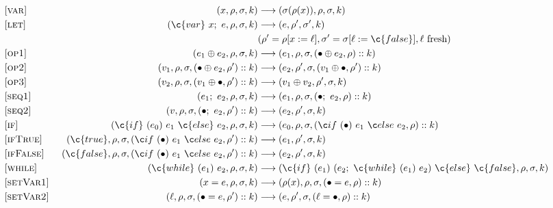 \begin{figure*}
  \begin{center}
\begin{align*}
  \omit [\textsc{var}] &&
    (x, \rho, \sigma, k)
    & \longrightarrow
    (\sigma(\rho(x)), \rho, \sigma, k)
\\
  \omit [\textsc{let}] &&
    (\c{var}~x;~e, \rho, \sigma, k)
    & \longrightarrow
    (e, \rho', \sigma', k) 
        \\ &&& (\rho' = \rho[x := \ell], \sigma' = \sigma[\ell := \c{false}], \ell~\mbox{fresh})
\\
  \omit [\textsc{op1}] &&
    (e_1 \oplus  e_2, \rho, \sigma, k)
    & \longrightarrow
    (e_1, \rho, \sigma, (\bullet \oplus e_2,\rho)::k)
\\
  \omit [\textsc{op2}] &&
    (v_1, \rho, \sigma, (\bullet \oplus e_2,\rho')::k)
    & \longrightarrow
    (e_2, \rho', \sigma, (v_1\oplus \bullet,\rho')::k)
\\
  \omit [\textsc{op3}] &&
    (v_2, \rho, \sigma, (v_1 \oplus \bullet,\rho')::k)
    & \longrightarrow
    (v_1 \oplus v_2, \rho', \sigma, k)
\\
  \omit [\textsc{seq1}] &&
    (e_1;~e_2, \rho, \sigma, k)
    & \longrightarrow
    (e_1, \rho, \sigma, \then{e_2}{\rho}::k)
\\
  \omit [\textsc{seq2}] &&
    (v, \rho, \sigma, \then{e_2}{\rho'}::k)
    & \longrightarrow
    (e_2, \rho', \sigma, k)
\\
  \omit [\textsc{if}] &&
    (\c{if}~(e_0)~e_1~\c{else}~e_2, \rho, \sigma, k)
    & \longrightarrow
    (e_0, \rho, \sigma, \branch{e_1}{e_2}{\rho}::k)
\\
  \omit [\textsc{ifTrue}] &&
    (\c{true}, \rho, \sigma, \branch{e_1}{e_2}{\rho'}::k)
    & \longrightarrow
    (e_1, \rho', \sigma, k)
\\
  \omit [\textsc{ifFalse}] &&
    (\c{false}, \rho, \sigma, \branch{e_1}{e_2}{\rho'}::k)
    & \longrightarrow
    (e_2, \rho', \sigma, k)
\\
  \omit [\textsc{while}] &&
    (\c{while}~(e_1)~e_2, \rho, \sigma, k)
    & \longrightarrow
    (\c{if}~(e_1)~(e_2;~ \c{while}~(e_1)~e_2)~\c{else}~\c{false}, \rho, \sigma, k)
\\
  \omit [\textsc{setVar1}] &&
    (x = e, \rho, \sigma, k)
    & \longrightarrow
    (\rho(x), \rho, \sigma, (\bullet = e, \rho)::k)
\\
  \omit [\textsc{setVar2}] &&
    (\ell, \rho, \sigma, (\bullet = e, \rho')::k)
    & \longrightarrow
    (e, \rho', \sigma, (\ell = \bullet, \rho)::k)

\end{align*}
\end{center}
\end{figure*}
